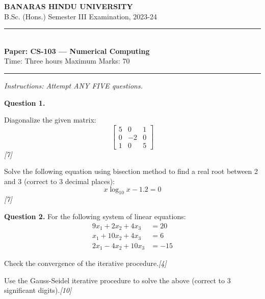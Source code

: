 \documentclass[11pt,a4paper]{article}
\newcommand{\pts}[1]{\hfill   \textit{[#1]}}
\begin{document}
\begin{center}
  {\large\bfseries BANARAS HINDU UNIVERSITY}\\[2pt]
  {
\normalsize B.Sc. (Hons.) Semester III Examination, 2023-24}\\[6pt]
  \rule{0.8\linewidth}{0.5pt}\\[6pt]
  {\large\bfseries Paper: CS-103 --- Numerical Computing}\\[4pt]
  {
\normalsize Time: Three hours \hfill Maximum Marks: 70}
\end{center}

\rule{\linewidth}{0.4pt}

\smallskip



\noindent   \textit{Instructions: Attempt ANY FIVE questions.}

\bigskip

\medskip


\noindent   \textbf{Question 1.}

\begin{parts}
  \item Diagonalize the given matrix:
  \[ 
\begin{bmatrix} 5 & 0 & 1 \\ 0 & -2 & 0 \\ 1 & 0 & 5 \end{bmatrix} \]\pts{7}
  \item Solve the following equation using bisection method to find a real root between 2 and 3 (correct to 3 decimal places):
  \[ x \log_{10} x - 1.2 = 0 \]\pts{7}
\end{parts}

\medskip


\noindent   \textbf{Question 2.} For the following system of linear equations:
\[

\begin{aligned}
  9x_1 + 2x_2 + 4x_3 &= 20 \\
  x_1 + 10x_2 + 4x_3 &= 6 \\
  2x_1 - 4x_2 + 10x_3 &= -15
\end{aligned}
\]

\begin{parts}
  \item Check the convergence of the iterative procedure.\pts{4}
  \item Use the Gauss-Seidel iterative procedure to solve the above (correct to 3 significant digits).\pts{10}
\end{parts}
\end{document}
